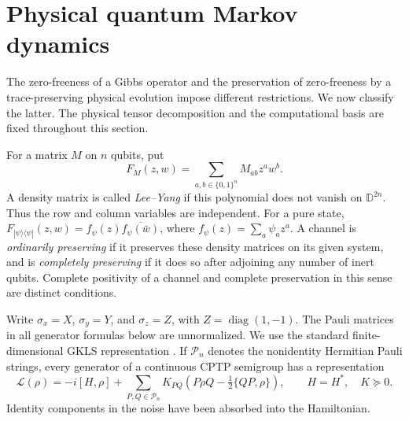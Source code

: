 \documentclass[reqno]{amsart}
\theoremstyle{definition}
\theoremstyle{remark}
\newcommand{\D}{\mathbb D}
\DeclareMathOperator{\diag}{diag}
\begin{document}

\section{Physical quantum Markov dynamics}\label{dyn:section}

The zero-freeness of a Gibbs operator and the preservation of zero-freeness by
a trace-preserving physical evolution impose different restrictions.  We now
classify the latter.  The physical tensor decomposition and the computational
basis are fixed throughout this section.

For a matrix $M$ on $n$ qubits, put
\begin{equation}\label{dyn:polynomial}
 F_M(z,w)=\sum_{a,b\in\{0,1\}^n}M_{ab}z^a w^b.
\end{equation}
A density matrix is called \emph{Lee--Yang} if this polynomial does not vanish
on $\D^{2n}$.  Thus the row and column variables are independent.  For a pure
state, $F_{|\psi\rangle\langle\psi|}(z,w)
=f_\psi(z)\overline{f_\psi(\bar w)}$, where
$f_\psi(z)=\sum_a\psi_a z^a$.  A channel is \emph{ordinarily preserving} if it
preserves these density matrices on its given system, and is \emph{completely
preserving} if it does so after adjoining any number of inert qubits.  Complete
positivity of a channel and complete preservation in this sense are distinct
conditions.

Write $\sigma_x=X$, $\sigma_y=Y$, and $\sigma_z=Z$, with
$Z=\diag(1,-1)$.  The Pauli matrices in all generator formulas below are
unnormalized.  We use the standard finite-dimensional GKLS representation
\cite{GKS76,Lindblad76}.  If $\mathcal P_n$ denotes the nonidentity Hermitian
Pauli strings, every generator of a continuous CPTP semigroup has a
representation
\begin{equation}\label{dyn:gkls}
 \mathcal L(\rho)=-i[H,\rho]
 +\sum_{P,Q\in\mathcal P_n}K_{PQ}
 \left(P\rho Q-\tfrac12\{QP,\rho\}\right),
 \qquad H=H^*,\quad K\succeq0.
\end{equation}
Identity components in the noise have been absorbed into the Hamiltonian.
\end{document}
